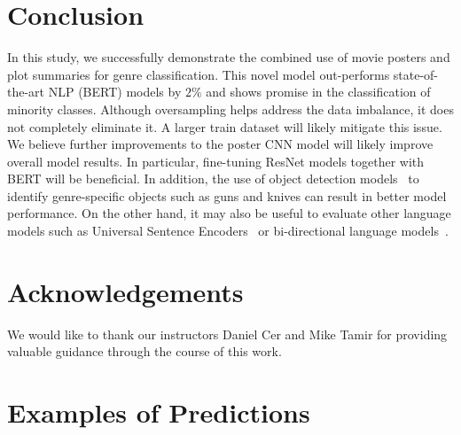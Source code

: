 \documentclass[10pt]{article}
\begin{document}
\section{Conclusion}
In this study, we successfully demonstrate the combined use of movie posters and plot summaries for genre classification. This novel model out-performs state-of-the-art NLP (BERT) models by $2\%$ and shows promise in the classification of minority classes. Although oversampling helps address the data imbalance, it does not completely eliminate it. A larger train dataset will likely mitigate this issue.
We believe further improvements to the poster CNN model will likely improve overall model results. In particular, fine-tuning ResNet models together with BERT will be beneficial. In addition, the use of object detection models~\cite{ChuGuo2017} to identify genre-specific objects such as guns and knives can result in better model performance. On the other hand, it may also be useful to evaluate other language models such as Universal Sentence Encoders~\cite{Cer2018} or bi-directional language models~\cite{Peters2018}.

\section*{Acknowledgements}
We would like to thank our instructors Daniel Cer and Mike Tamir for providing valuable guidance through the course of this work.




\onecolumn
\appendix
\label{app:examples}
\section{Examples of Predictions}
\end{document}
